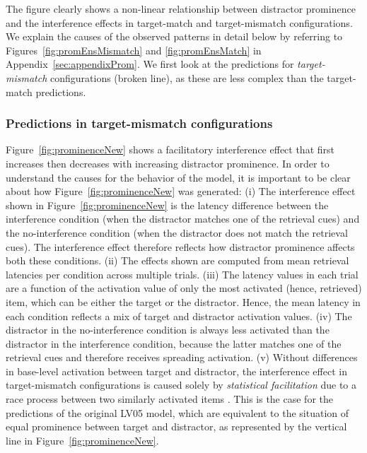 \documentclass{cambridge7A}\usepackage[]{graphicx}\usepackage[]{color}
\begin{document}
The figure clearly shows a non-linear relationship between distractor prominence and the interference effects in target-match and target-mismatch configurations. We explain the causes of the observed patterns in detail below by referring to Figures~\ref{fig:promEnsMismatch} and \ref{fig:promEnsMatch} in Appendix~\ref{sec:appendixProm}. We first look at the predictions for \emph{target-mismatch} configurations (broken line), as these are less complex than the target-match predictions.

\subsubsection{Predictions in target-mismatch configurations}\label{promexpl}
Figure~\ref{fig:prominenceNew} shows a  facilitatory interference effect that first increases then decreases with increasing  distractor prominence.
In order to understand the causes for the behavior of the model, it is important to be clear about how Figure~\ref{fig:prominenceNew} was generated: 
(i) The  interference effect shown in Figure~\ref{fig:prominenceNew} is the latency difference between the interference condition (when the distractor matches one of the retrieval cues) and the no-interference condition (when the distractor does not match the retrieval cues). The interference effect therefore reflects how distractor prominence affects both these conditions.
(ii) The effects shown are computed from mean retrieval latencies per condition across multiple trials. 
(iii) The latency values in each trial are a function of the activation value of only the most activated (hence, retrieved) item, which can be either the target or the distractor. Hence, the mean latency in each condition reflects a mix of target and distractor activation values.
(iv) The distractor in the no-interference condition is always less activated than the distractor in the interference condition, because the latter matches one of the retrieval cues and therefore receives spreading activation.
(v) Without differences in base-level activation between target and distractor, the interference effect in target-mismatch configurations is caused solely by  \emph{statistical facilitation} due to a  race process between two similarly activated items \citep{LogacevVasishth2015,raab1962division}.
This is the case for the predictions of the original LV05 model, which are equivalent to the situation of equal prominence between target and distractor, as represented by the vertical line in Figure~\ref{fig:prominenceNew}. 
\end{document}
